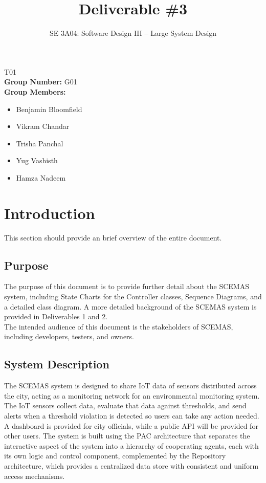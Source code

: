 \documentclass[]{article}
\title{Deliverable \#3}
\author{SE 3A04: Software Design III -- Large System Design}
\date{}
\begin{document}
\maketitle	
{} T01\\
{\bf Group Number:} G01 \\
{\bf Group Members:} 
\begin{itemize}
	\item Benjamin Bloomfield
	\item Vikram Chandar
    \item Trisha Panchal
    \item Yug Vashisth
    \item Hamza Nadeem
\end{itemize}

\newpage
\section{Introduction}
\label{sec:introduction}

This section should provide an brief overview of the entire document.

\subsection{Purpose}
\label{sub:purpose}
    The purpose of this document is to provide further detail about the SCEMAS system, including State Charts for the Controller classes, Sequence Diagrams, and a detailed class diagram. A more detailed background of the SCEMAS system is provided in Deliverables 1 and 2.\\
    The intended audience of this document is the stakeholders of SCEMAS, including developers, testers, and owners.

\subsection{System Description}
\label{sub:system_description}
    The SCEMAS system is designed to share IoT data of sensors distributed across the city, acting as a monitoring network for an environmental monitoring system. The IoT sensors collect data, evaluate that data against thresholds, and send alerts when a threshold violation is detected so users can take any action needed. A dashboard is provided for city officials, while a public API will be provided for other users. The system is built using the PAC architecture that separates the interactive aspect of the system into a hierarchy of cooperating agents, each with its own logic and control component, complemented by the Repository architecture, which provides a centralized data store with consistent and uniform access mechanisms. 
\end{document}
